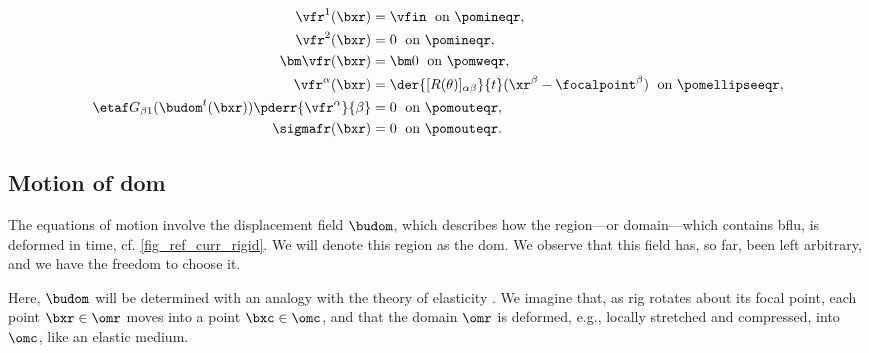 \begin{align}
        \label{bc_fl_rigid_1_reference}
        \vfr^1(\bxr)                                                  & =  \vfin \; \text{ on } \pomineqr,                                                                     \\
        \label{bc_fl_rigid_2_reference}
        \vfr^2      (\bxr)                                            & =  0 \; \text{ on } \pomineqr ,                                                                        \\
        \label{bc_fl_rigid_3_reference}
        {\bm \vfr} (\bxr)                                             & = {\bm 0} \; \text{ on } \pomweqr ,                                                                    \\
        \label{bc_fl_rigid_4_reference}
        \vfr^\alpha(\bxr)                                             & = \der{[R(\theta)]_{\alpha \beta} }{t} (\xr^\beta - \focalpoint^\beta) \; \text{ on } \pomellipseeqr , \\
        \label{bc_fl_rigid_5_reference}
        \etaf G_{\beta 1}(\budom^t(\bxr)) \pderr{ \vfr^\alpha}{\beta} & = 0  \; \text{ on } \pomouteqr ,                                                                       \\
        \label{bc_fl_rigid_6_reference}
        \sigmafr (\bxr)                                               & = 0 \; \text{ on } \pomouteqr.
\end{align}




\subsection{Motion of \acl{dom}}
\label{sec_eq_fluid_domain}


The equations of motion \crefs{\eqsfluidbodyref} involve the displacement field $\budom$, which describes how the region---or domain---which contains \ac{bflu}, is deformed in time, cf. \cref{fig_ref_curr_rigid}. We will denote this region as the  \ac{dom}.
We observe that this field has, so far, been left arbitrary, and we have the freedom to choose it.

Here, $\budom$ will be determined with an analogy with the theory of elasticity \cite{kamenskyLectureNotesMAE}. We imagine that, as \ac{rig} rotates about its focal point,  each point $\bxr \in \omr$ moves into a point $\bxc \in \omc$, and that the domain $\omr$ is deformed, e.g., locally stretched and compressed, into $\omc$, like an elastic medium.

